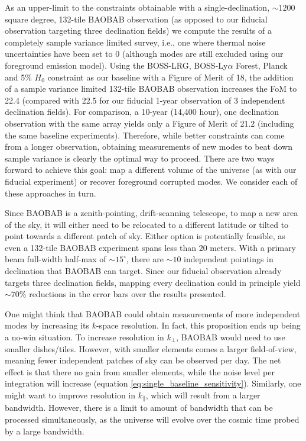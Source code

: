 \documentclass[10pt,iop]{emulateapj}
\begin{document}
As an upper-limit to the constraints obtainable with a single-declination, $\sim1200$ square degree, 
132-tile BAOBAB observation (as opposed to our fiducial observation targeting three declination 
fields)
we compute the results of a completely sample variance limited survey, i.e., one where thermal noise
uncertainties have been set to 0 (although modes are still excluded using our foreground
emission model).  Using the BOSS-LRG, BOSS-Ly$\alpha$ Forest, Planck and 5\% $H_0$
constraint as our baseline with a Figure of Merit of 18, the addition of a sample variance
limited 132-tile BAOBAB observation increases the FoM to 22.4 (compared with 22.5 for our
fiducial 1-year observation of 3 independent declination fields).  
For comparison, a 10-year (14,400 hour), one declination observation with the same
array yields only a Figure of Merit of 21.2 (including the same baseline experiments).
Therefore, while better constraints can come from a longer observation, obtaining measurements of 
new modes to beat down sample variance is clearly the optimal way to proceed.  There are two ways
forward to achieve this goal: map a different volume of the universe (as with our fiducial 
experiment) or recover foreground corrupted modes.  We consider each of these approaches in turn.

Since BAOBAB is a zenith-pointing, drift-scanning telescope, to map a new area of the sky, it will
either need to be relocated to a different latitude or tilted to point towards a different patch of sky.  Either option
is potentially feasible, as even a 132-tile BAOBAB experiment spans less than 20 meters.  With
a primary beam full-width half-max of $\sim 15^{\circ}$, there are $\sim10$ independent pointings
in declination that BAOBAB can target.  Since our fiducial observation already targets three
declination fields, mapping every declination could in principle yield $\sim70\%$ reductions
in the error bars over the results presented. 

One might think that BAOBAB could obtain measurements of more independent modes by increasing its
$k$-space resolution.  In fact, this proposition ends up being a no-win situation.  To increase
resolution in $k_{\perp}$, BAOBAB would need to use smaller dishes/tiles.  However, with smaller
elements comes a larger field-of-view, meaning fewer independent patches of sky can be observed
per day.  The net effect is that there no gain from smaller elements, while the noise level
per integration will increase (equation \ref{eq:single_baseline_sensitivity}).  Similarly, one
might want to improve resolution in $k_{\parallel}$, which will result from a larger bandwidth.
However, there is a limit to amount of bandwidth that can be processed simultaneously,
as the universe will evolve over the cosmic time probed by a large bandwidth.
\end{document}
